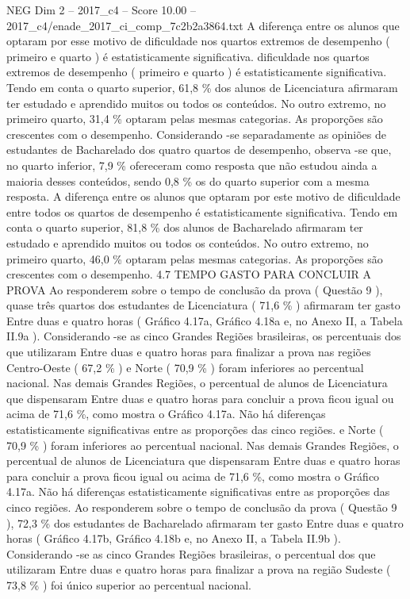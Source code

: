\begin{textsample}{NEG Dim 2 – 2017\_c4 – Score 10.00 – 2017\_c4/enade\_2017\_ci\_comp\_7c2b2a3864.txt}
A diferença entre os alunos que optaram por esse motivo de dificuldade nos quartos extremos de desempenho ( primeiro e quarto ) é estatisticamente significativa. dificuldade nos quartos extremos de desempenho ( primeiro e quarto ) é estatisticamente significativa.
Tendo em conta o quarto superior, 61,8 \% dos alunos de Licenciatura afirmaram ter estudado e aprendido muitos ou todos os conteúdos.
No outro extremo, no primeiro quarto, 31,4 \% optaram pelas mesmas categorias.
As proporções são crescentes com o desempenho.
Considerando -se separadamente as opiniões de estudantes de Bacharelado dos quatro quartos de desempenho, observa -se que, no quarto inferior, 7,9 \% ofereceram como resposta que não estudou ainda a maioria desses conteúdos, sendo 0,8 \% os do quarto superior com a mesma resposta.
A diferença entre os alunos que optaram por este motivo de dificuldade entre todos os quartos de desempenho é estatisticamente significativa.
Tendo em conta o quarto superior, 81,8 \% dos alunos de Bacharelado afirmaram ter estudado e aprendido muitos ou todos os conteúdos.
No outro extremo, no primeiro quarto, 46,0 \% optaram pelas mesmas categorias.
As proporções são crescentes com o desempenho. 4.7 TEMPO GASTO PARA CONCLUIR A PROVA Ao responderem sobre o tempo de conclusão da prova ( Questão 9 ), quase três quartos dos estudantes de Licenciatura ( 71,6 \% ) afirmaram ter gasto Entre duas e quatro horas ( Gráfico 4.17a, Gráfico 4.18a e, no Anexo II, a Tabela II.9a ).
Considerando -se as cinco Grandes Regiões brasileiras, os percentuais dos que utilizaram Entre duas e quatro horas para finalizar a prova nas regiões Centro-Oeste ( 67,2 \% ) e Norte ( 70,9 \% ) foram inferiores ao percentual nacional.
Nas demais Grandes Regiões, o percentual de alunos de Licenciatura que dispensaram Entre duas e quatro horas para concluir a prova ficou igual ou acima de 71,6 \%, como mostra o Gráfico 4.17a.
Não há diferenças estatisticamente significativas entre as proporções das cinco regiões. e Norte ( 70,9 \% ) foram inferiores ao percentual nacional.
Nas demais Grandes Regiões, o percentual de alunos de Licenciatura que dispensaram Entre duas e quatro horas para concluir a prova ficou igual ou acima de 71,6 \%, como mostra o Gráfico 4.17a.
Não há diferenças estatisticamente significativas entre as proporções das cinco regiões.
Ao responderem sobre o tempo de conclusão da prova ( Questão 9 ), 72,3 \% dos estudantes de Bacharelado afirmaram ter gasto Entre duas e quatro horas ( Gráfico 4.17b, Gráfico 4.18b e, no Anexo II, a Tabela II.9b ).
Considerando -se as cinco Grandes Regiões brasileiras, o percentual dos que utilizaram Entre duas e quatro horas para finalizar a prova na região Sudeste ( 73,8 \% ) foi único superior ao percentual nacional.

\end{textsample}
